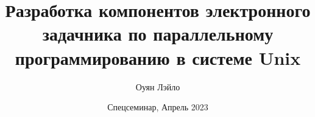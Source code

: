 \title
[Задачника в Unix]{Разработка компонентов электронного задачника по параллельному программированию в системе Unix}


\author
{Оуян Лэйло}


\date{Спецсеминар, Апрель 2023}


